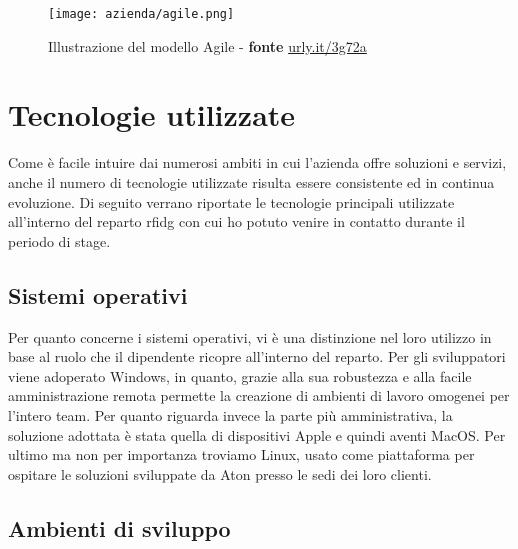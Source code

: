 \begin{figure}[!ht] 
    \centering 
    \texttt{[image: azienda/agile.png]} 
    \caption{Illustrazione del modello Agile - \textbf{fonte} \url{urly.it/3g72a}}
    \label{agile_example}
\end{figure}

\section{Tecnologie utilizzate}

Come è facile intuire dai numerosi ambiti in cui l'azienda offre soluzioni e servizi, anche il numero di tecnologie utilizzate risulta essere consistente
ed in continua evoluzione. Di seguito verrano riportate le tecnologie principali utilizzate all'interno del reparto \gls{rfidg} con cui ho potuto venire in contatto
durante il periodo di stage.

\subsection{Sistemi operativi}

Per quanto concerne i sistemi operativi, vi è una distinzione nel loro utilizzo in base al ruolo che il dipendente ricopre all'interno del reparto. 
Per gli sviluppatori viene adoperato Windows, in quanto, grazie alla sua robustezza e alla facile amministrazione remota permette la creazione di ambienti
di lavoro omogenei per l'intero team. Per quanto riguarda invece la parte più amministrativa, la soluzione adottata è stata quella di dispositivi Apple
e quindi aventi MacOS. Per ultimo ma non per importanza troviamo Linux, usato come piattaforma per ospitare le soluzioni sviluppate da Aton presso le sedi
dei loro clienti.

\subsection{Ambienti di sviluppo}

